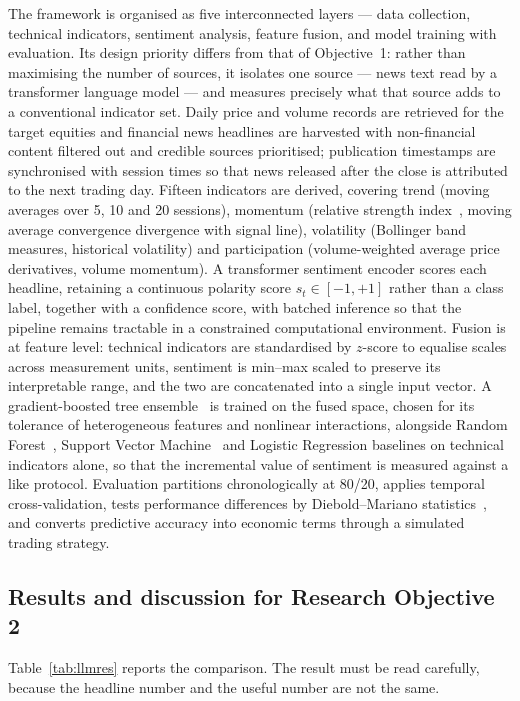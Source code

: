 The framework is organised as five interconnected layers --- data collection, technical
indicators, sentiment analysis, feature fusion, and model training with evaluation. Its design
priority differs from that of Objective~1: rather than maximising the number of sources, it
isolates one source --- news text read by a transformer language model --- and measures
precisely what that source adds to a conventional indicator set. Daily price and volume records
are retrieved for the target equities and financial news headlines are harvested with
non-financial content filtered out and credible sources prioritised; publication timestamps are
synchronised with session times so that news released after the close is attributed to the next
trading day. Fifteen indicators are derived, covering trend (moving averages over 5, 10 and 20
sessions), momentum (relative strength index~\cite{wilder1978}, moving average convergence
divergence with signal line), volatility (Bollinger band measures, historical volatility) and
participation (volume-weighted average price derivatives, volume momentum). A transformer
sentiment encoder scores each headline, retaining a continuous polarity score
$s_t \in [-1,+1]$ rather than a class label, together with a confidence score, with batched
inference so that the pipeline remains tractable in a constrained computational environment.
Fusion is at feature level: technical indicators are standardised by $z$-score to equalise
scales across measurement units, sentiment is min--max scaled to preserve its interpretable
range, and the two are concatenated into a single input vector. A gradient-boosted tree
ensemble~\cite{chen2016xgboost} is trained on the fused space, chosen for its tolerance of
heterogeneous features and nonlinear interactions, alongside Random
Forest~\cite{breiman2001}, Support Vector Machine~\cite{cortes1995svm} and Logistic Regression
baselines on technical indicators alone, so that the incremental value of sentiment is measured
against a like protocol. Evaluation partitions chronologically at 80/20, applies temporal
cross-validation, tests performance differences by Diebold--Mariano
statistics~\cite{diebold1995}, and converts predictive accuracy into economic terms through a
simulated trading strategy.

\subsection{Results and discussion for Research Objective 2}

Table~\ref{tab:llmres} reports the comparison. The result must be read carefully, because the
headline number and the useful number are not the same.

